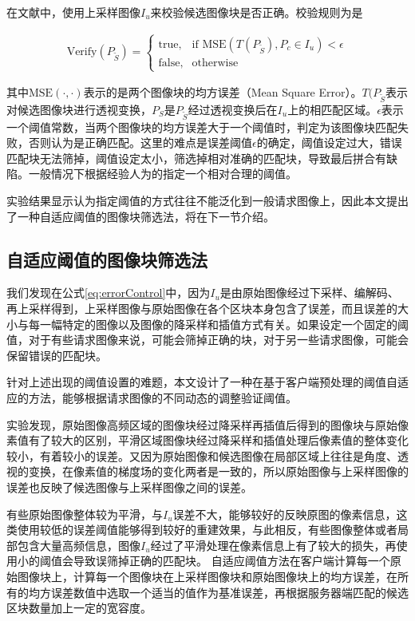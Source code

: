 在文献\cite{Dai:2012vn}中，使用上采样图像\(I_u\)来校验候选图像块是否正确。校验规则为是

\begin{align}
\label{eq:errorControl}
  \text{Verify}(P_{\tilde{S}}) = 
\begin{cases} 
\text{true}, & \mbox{if MSE} (T(P_{\tilde{S}}),P_c \in I_u) < \epsilon \\
\text{false}, & \mbox{otherwise}
\end{cases}
\end{align}

其中\(\text{MSE}(\cdot,\cdot)\)表示的是两个图像块的均方误差（Mean Square Error）。\(T(P_{\tilde{S}}\)表示对候选图像块进行透视变换，\(P_{S}\)是\(P_{\tilde{S}}\)经过透视变换后在\(I_u\)上的相匹配区域。\(\epsilon\)表示一个阈值常数，当两个图像块的均方误差大于一个阈值时，判定为该图像块匹配失败，否则认为是正确匹配。这里的难点是误差阈值\(\epsilon\)的确定，阈值设定过大，错误匹配块无法筛掉，阈值设定太小，筛选掉相对准确的匹配块，导致最后拼合有缺陷。一般情况下根据经验人为的指定一个相对合理的阈值。

实验结果显示认为指定阈值的方式往往不能泛化到一般请求图像上，因此本文提出了一种自适应阈值的图像块筛选法，将在下一节介绍。

\subsection{自适应阈值的图像块筛选法}

我们发现在公式\ref{eq:errorControl}中，因为\(I_u\)是由原始图像经过下采样、编解码、再上采样得到，上采样图像与原始图像在各个区块本身包含了误差，而且误差的大小与每一幅特定的图像以及图像的降采样和插值方式有关。如果设定一个固定的阈值，对于有些请求图像来说，可能会筛掉正确的块，对于另一些请求图像，可能会保留错误的匹配块。

针对上述出现的阈值设置的难题，本文设计了一种在基于客户端预处理的阈值自适应的方法，能够根据请求图像的不同动态的调整验证阈值。

实验发现，原始图像高频区域的图像块经过降采样再插值后得到的图像块与原始像素值有了较大的区别，平滑区域图像块经过降采样和插值处理后像素值的整体变化较小，有着较小的误差。又因为原始图像和候选图像在局部区域上往往是角度、透视的变换，在像素值的梯度场的变化两者是一致的，所以原始图像与上采样图像的误差也反映了候选图像与上采样图像之间的误差。

有些原始图像整体较为平滑，与\(I_u\)误差不大，能够较好的反映原图的像素信息，这类使用较低的误差阈值能够得到较好的重建效果，与此相反，有些图像整体或者局部包含大量高频信息，图像\(I_u\)经过了平滑处理在像素信息上有了较大的损失，再使用小的阈值会导致误筛掉正确的匹配块。
自适应阈值方法在客户端计算每一个原始图像块上，计算每一个图像块在上采样图像块和原始图像块上的均方误差，在所有的均方误差数值中选取一个适当的值作为基准误差，再根据服务器端匹配的候选区块数量加上一定的宽容度。

